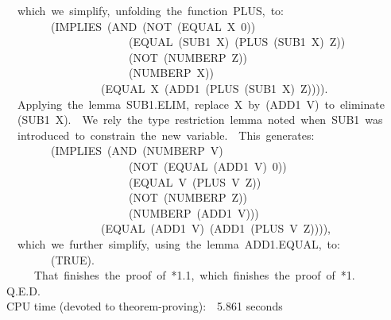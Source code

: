 \documentclass[10pt]{book}
\newenvironment{pubasis}{\begin{flushleft}}{\end{flushleft}}
\begin{document}
\begin{pubasis}
~~which~we~simplify,~unfolding~the~function~PLUS,~to:\\

~~~~~~~~(IMPLIES~(AND~(NOT~(EQUAL~X~0))\\
~~~~~~~~~~~~~~~~~~~~~~(EQUAL~(SUB1~X)~(PLUS~(SUB1~X)~Z))\\
~~~~~~~~~~~~~~~~~~~~~~(NOT~(NUMBERP~Z))\\
~~~~~~~~~~~~~~~~~~~~~~(NUMBERP~X))\\
~~~~~~~~~~~~~~~~~(EQUAL~X~(ADD1~(PLUS~(SUB1~X)~Z)))).\\

~~Applying~the~lemma~SUB1.ELIM,~replace~X~by~(ADD1~V)~to~eliminate\\
~~(SUB1~X).~~We~rely~the~type~restriction~lemma~noted~when~SUB1~was\\
~~introduced~to~constrain~the~new~variable.~~This~generates:\\

~~~~~~~~(IMPLIES~(AND~(NUMBERP~V)\\
~~~~~~~~~~~~~~~~~~~~~~(NOT~(EQUAL~(ADD1~V)~0))\\
~~~~~~~~~~~~~~~~~~~~~~(EQUAL~V~(PLUS~V~Z))\\
~~~~~~~~~~~~~~~~~~~~~~(NOT~(NUMBERP~Z))\\
~~~~~~~~~~~~~~~~~~~~~~(NUMBERP~(ADD1~V)))\\
~~~~~~~~~~~~~~~~~(EQUAL~(ADD1~V)~(ADD1~(PLUS~V~Z)))),\\

~~which~we~further~simplify,~using~the~lemma~ADD1.EQUAL,~to:\\

~~~~~~~~(TRUE).\\

~~~~~That~finishes~the~proof~of~*1.1,~which~finishes~the~proof~of~*1.\\
Q.E.D.\\

CPU time (devoted to theorem-proving):~~5.861 seconds\\
\end{pubasis}
\end{document}
